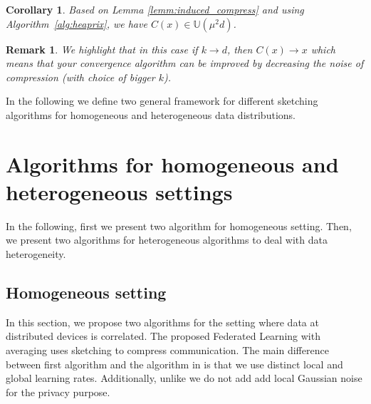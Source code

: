 \documentclass{article}
\newtheorem{corollary}{Corollary}
\newtheorem{remark}{Remark}
\begin{document}
\begin{corollary}
Based on Lemma \ref{lemm:induced_compress} and using Algorithm~\ref{alg:heaprix}, we have $C(x)\in \mathbb{U}(\mu^2 d)$.
\end{corollary}
\begin{remark}
We highlight that in this case if $k\rightarrow d$, then $C(x)\rightarrow x$ which means that your convergence algorithm can be improved by decreasing the noise of compression (with choice of bigger $k$). 
\end{remark}

In the following we define two general framework for different sketching algorithms for homogeneous and heterogeneous data distributions.


\section{Algorithms for homogeneous and heterogeneous settings}\label{sec:algos}
In the following, first we present two algorithm for homogeneous setting. Then, we present two algorithms for heterogeneous algorithms to deal with data heterogeneity.   

\subsection{Homogeneous setting}
In this section, we propose two algorithms for the setting where data at distributed devices is  correlated. The proposed Federated Learning with averaging uses sketching to compress communication. The main difference between first algorithm and the algorithm in \cite{li2019privacy} is that we use distinct local and global learning rates. Additionally, unlike \cite{li2019privacy} we do not add add local Gaussian noise for the privacy purpose. 
\end{document}
